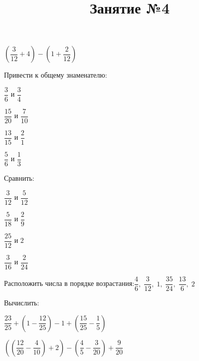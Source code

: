 \begin{listofex}
\begin{enumcols}[itemcolumns=2]
		\item \( \left( \dfrac{3}{12}+4 \right)-\left( 1+\dfrac{2}{12} \right) \)
	\end{enumcols}
	\item Привести к общему знаменателю:
	\begin{enumcols}[itemcolumns=4]
		\item \( \dfrac{3}{6} \) и \( \dfrac{3}{4} \)
		\item \( \dfrac{15}{20} \) и \( \dfrac{7}{10} \)
		\item \( \dfrac{13}{15} \) и \( \dfrac{2}{1} \)
		\item \( \dfrac{5}{6} \) и \( \dfrac{1}{3} \)
	\end{enumcols}
	\item Сравнить:
	\begin{enumcols}[itemcolumns=4]
		\item \( \dfrac{3}{12} \) и \( \dfrac{5}{12} \)
		\item \( \dfrac{5}{18} \) и \( \dfrac{2}{9} \)
		\item \( \dfrac{25}{12} \) и \( 2 \)
		\item \( \dfrac{3}{16} \) и \( \dfrac{2}{24} \)
	\end{enumcols}
	\item Расположить числа в порядке возрастания:\quad\( \dfrac{4}{6},\;\dfrac{3}{12},\;1,\;\dfrac{35}{24},\;\dfrac{13}{6},\;2 \)
	\item Вычислить:
	\begin{enumcols}[itemcolumns=2]
		\item \( \dfrac{23}{25}+\left( 1-\dfrac{12}{25} \right)-1+\left( \dfrac{15}{25}-\dfrac{1}{5} \right) \)
		\item \( \left( \left( \dfrac{12}{20}-\dfrac{4}{10} \right) + 2\right)-\left( \dfrac{4}{5}-\dfrac{3}{20} \right)+\dfrac{9}{20} \)
	\end{enumcols}
\end{listofex}
\newpage
\title{Занятие №4}
